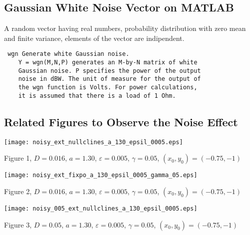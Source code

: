 \documentclass{article}
\begin{document}
\subsection{Gaussian White Noise Vector on MATLAB}
A random vector having real numbers, probability distribution with zero mean and finite variance, elements of the vector are indipendent. 
\begin{lstlisting}
 wgn Generate white Gaussian noise.
    Y = wgn(M,N,P) generates an M-by-N matrix of white 
    Gaussian noise. P specifies the power of the output
    noise in dBW. The unit of measure for the output of
    the wgn function is Volts. For power calculations, 
    it is assumed that there is a load of 1 Ohm. 
\end{lstlisting}

\subsection{Related Figures to Observe the Noise Effect}

\begin{center}
\texttt{[image: noisy\_ext\_nullclines\_a\_130\_epsil\_0005.eps]}
\begin{footnotesize}
 Figure 1,  $D=0.016$, $a=1.30$, $\varepsilon=0.005$,          $\gamma=0.05$, $(x_0,y_0)=(-0.75,-1)$  
\end{footnotesize}
\end{center}

\begin{center}
\texttt{[image: noisy\_ext\_fixpo\_a\_130\_epsil\_0005\_gamma\_05.eps]}
\begin{footnotesize}
 Figure 2,  $D=0.016$, $a=1.30$, $\varepsilon=0.005$,          $\gamma=0.05$, $(x_0,y_0)=(-0.75,-1)$  
\end{footnotesize}
\end{center}

\begin{center}
\texttt{[image: noisy\_005\_ext\_nullclines\_a\_130\_epsil\_0005.eps]}
\begin{footnotesize}
 Figure 3,  $D=0.05$, $a=1.30$, $\varepsilon=0.005$,          $\gamma=0.05$, $(x_0,y_0)=(-0.75,-1)$  
\end{footnotesize}
\end{center}
\end{document}
